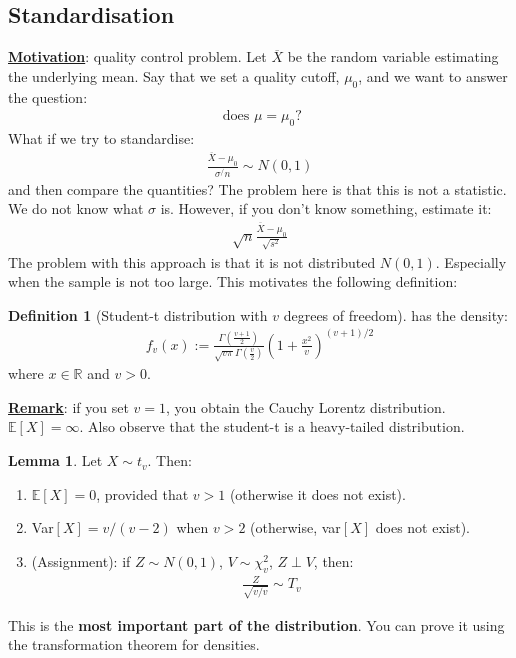 \documentclass[11pt]{scrartcl}
\newcommand{\R}[0]{\mathbb{R}}
\theoremstyle{definition}
\newtheorem{lemma}[theorem]{Lemma}
\newtheorem{definition}{Definition}
\theoremstyle{remark}
\newcommand{\dfn}[1]{\textbf{\underline{#1}}}
\newcommand{\EX}[1]{\mathbb{E}\left[#1 \right]}
\begin{document}
\subsection{Standardisation}
\dfn{Motivation}: quality control problem. Let $\overline{X}$ be the random variable estimating the underlying mean. Say that we set a quality cutoff, $\mu_0$, and we want to answer the question: 
\begin{align*}
	\text{ does } \mu = \mu_0? 	
\end{align*}
What if we try to standardise: 
\begin{align*}
	\frac{\overline{X} - \mu_0}{\sigma^/n}	 \sim N(0,1)
\end{align*}
and then compare the quantities? The problem here is that this is not a statistic. We do not know what $\sigma$ is. However, if you don't know something, estimate it: 
\begin{align*}
	\sqrt{n} \frac{\overline{X} - \mu_0}{\sqrt{s^2} }	
\end{align*}
The problem with this approach is that it is not distributed $N(0,1)$. Especially when the sample is not too large. This motivates the following definition: 

\begin{definition}[Student-t distribution with $v$ degrees of freedom] has the density: 
\begin{align*}
	f_v(x) := \frac{\Gamma \left( \frac{v+1}{2} \right) }{\sqrt{ v \pi} \Gamma \left( 	\frac{v}{2}	\right) }	\left(1+ \frac{x^2}{v}	\right)^{(v+1)/2}
\end{align*}
	where $x \in \R$ and $v > 0$. 
	
\end{definition}

\dfn{Remark}: if you set $v=1$, you obtain the Cauchy Lorentz distribution. $\EX{X} = \infty$. Also observe that the student-t is a heavy-tailed distribution. 

\begin{lemma} Let $X \sim t_v$. Then: 
\begin{enumerate}[noitemsep]
	\item $\EX{X} = 0$, provided that $v> 1$ (otherwise it does not exist). 
	\item Var$[X] = v/(v-2)$ when $v > 2$ (otherwise, var$[X]$ does not exist). 
	\item (Assignment): if $Z \sim N(0,1)$, $V \sim \chi_v^2$, $Z \perp V$, then: 
	\begin{align}
		\frac{Z}{\sqrt{v/v}} \sim T_v 
	\end{align}
\end{enumerate}
	This is the \textbf{most important part of the distribution}. You can prove it using the transformation theorem for densities. 
\end{lemma}
\end{document}
